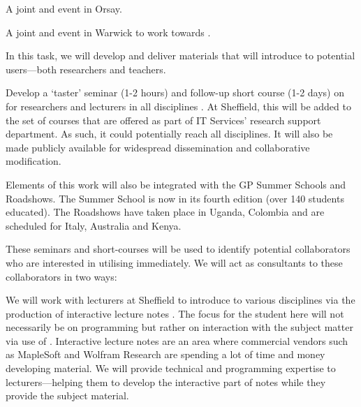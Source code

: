 \begin{workpackage}
\begin{tasklist}
\begin{task}[title=Community building: development workshops, lead=PS, id=devel-workshops]
\begin{compactitem}
\item A joint \Jupyter and \Sage event in Orsay.

\item A joint \LMFDB and \Sage event in Warwick to work towards
  .

\end{compactitem}


\end{task}

\begin{task}[title=Introduce \TheProject to researchers and teachers, id=project-intro,lead=USH,PM=6]

In this task, we will develop and deliver materials that will
introduce \TheProject to potential users---both researchers and
teachers.

Develop a `taster' seminar (1-2 hours) and follow-up short course (1-2
days) on \TheProject for researchers and lecturers in all disciplines
. At Sheffield, this will be added to
the set of courses that are offered as part of IT Services' research
support department. As such, it could potentially reach all
disciplines. It will also be made publicly available for widespread
dissemination and collaborative modification.

Elements of this work will also be integrated with the GP Summer
Schools and Roadshows. The Summer School is now in its fourth edition
(over 140 students educated). The Roadshows have taken place in
Uganda, Colombia and are scheduled for Italy, Australia and Kenya.

These seminars and short-courses will be used to identify potential
collaborators who are interested in utilising \TheProject
immediately. We will act as consultants to these collaborators in two
ways:

We will work with lecturers at Sheffield to introduce \TheProject to
various disciplines via the production of interactive lecture
notes . The focus for the student here will not necessarily be on
programming but rather on interaction with the subject matter via use
of \TheProject. Interactive lecture notes are an area where commercial
vendors such as MapleSoft and Wolfram Research are spending a lot of
time and money developing material. We will provide technical and
programming expertise to lecturers---helping them to develop the
interactive part of notes while they provide the subject material.


\end{task}
\end{tasklist}
\end{workpackage}
